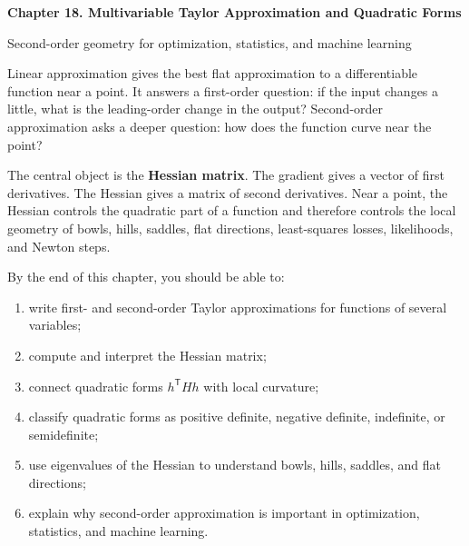 \documentclass[11pt]{article}
\newcommand{\T}{^{\mathsf T}}
\begin{document}
\begin{center}
  {\LARGE\bfseries Chapter 18. Multivariable Taylor Approximation and Quadratic Forms\par}
  \vspace{0.3em}
  {\large Second-order geometry for optimization, statistics, and machine learning\par}
\end{center}

\begin{chapteroverviewbox}
Linear approximation gives the best flat approximation to a differentiable function near a point. It answers a first-order question: if the input changes a little, what is the leading-order change in the output? Second-order approximation asks a deeper question: how does the function curve near the point?

The central object is the \textbf{Hessian matrix}. The gradient gives a vector of first derivatives. The Hessian gives a matrix of second derivatives. Near a point, the Hessian controls the quadratic part of a function and therefore controls the local geometry of bowls, hills, saddles, flat directions, least-squares losses, likelihoods, and Newton steps.
\end{chapteroverviewbox}

\begin{goalbox}
By the end of this chapter, you should be able to:
\begin{enumerate}
  \item write first- and second-order Taylor approximations for functions of several variables;
  \item compute and interpret the Hessian matrix;
  \item connect quadratic forms $h\T Hh$ with local curvature;
  \item classify quadratic forms as positive definite, negative definite, indefinite, or semidefinite;
  \item use eigenvalues of the Hessian to understand bowls, hills, saddles, and flat directions;
  \item explain why second-order approximation is important in optimization, statistics, and machine learning.
\end{enumerate}
\end{goalbox}
\end{document}
